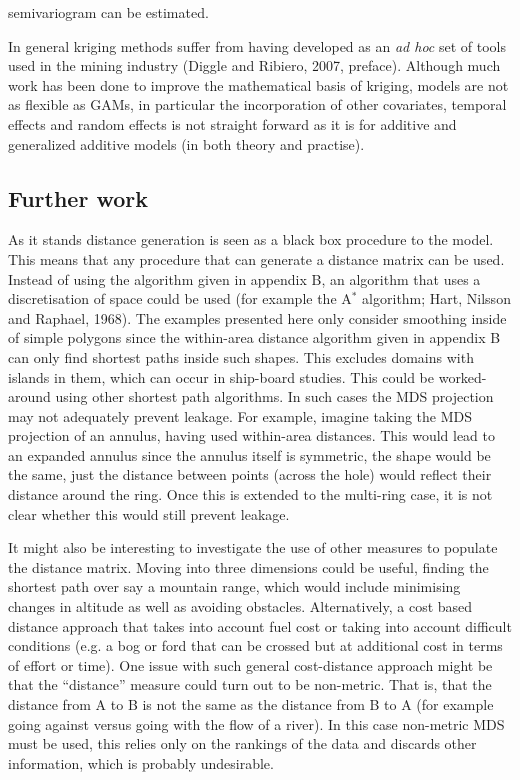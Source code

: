 \documentclass[useAMS, referee]{biom}
\begin{document}
semivariogram can be estimated.

In general kriging methods suffer from having developed as an \textit{ad hoc} set of tools used in the mining industry (Diggle and Ribiero, 2007, preface). Although much work has been done to improve the mathematical basis of kriging, models are not as flexible as GAMs, in particular the incorporation of other covariates, temporal effects and random effects is not straight forward as it is for additive and generalized additive models (in both theory and practise).

\subsection{Further work}
\label{s:furtherwork}

As it stands distance generation is seen as a black box procedure to the model. This means that any procedure that can generate a distance matrix can be used. Instead of using the algorithm given in appendix B, an algorithm that uses a discretisation of space could be used (for example the A$^*$ algorithm; Hart, Nilsson and Raphael, 1968). The examples presented here only consider smoothing inside of simple polygons since the within-area distance algorithm given in appendix B can only find shortest paths inside such shapes. This excludes domains with islands in them, which can occur in ship-board studies. This could be worked-around using other shortest path algorithms. In such cases the MDS projection may not adequately prevent leakage. For example, imagine taking the MDS projection of an annulus, having used within-area distances. This would lead to an expanded annulus since the annulus itself is symmetric, the shape would be the same, just the distance between points (across the hole) would reflect their distance around the ring. Once this is extended to the multi-ring case, it is not clear whether this would still prevent leakage.

It might also be interesting to investigate the use of other measures to populate the distance matrix. Moving into three dimensions could be useful, finding the shortest path over say a mountain range, which would include minimising changes in altitude as well as avoiding obstacles. Alternatively, a cost based distance approach that takes into account fuel cost or taking into account difficult conditions (e.g. a bog or ford that can be crossed but at additional cost in terms of effort or time). One issue with such general cost-distance approach might be that the ``distance'' measure could turn out to be non-metric. That is, that the distance from A to B is not the same as the distance from B to A (for example going against versus going with the flow of a river). In this case non-metric MDS must be used, this relies only on the rankings of the data and discards other information, which is probably undesirable.
\end{document}
